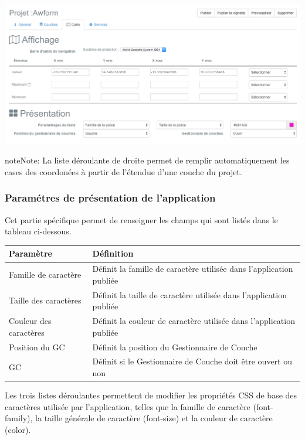 \documentclass[letterpaper,10pt,french]{sphinxmanual}
\begin{document}
\includegraphics[width=1.000\linewidth]{publisher-map-conf.png}

\begin{notice}{note}{Note:}
La liste déroulante de droite permet de remplir automatiquement les cases des coordonées à partir de l'étendue d'une couche du projet.
\end{notice}


\subsubsection{Paramétres de présentation de l'application}
\label{apps/appconfig:parametres-de-presentation-de-l-application}
Cet partie spécifique permet de renseigner les champs qui sont listés
dans le tableau ci-dessous.

\begin{tabulary}{\linewidth}{|L|L|}
\hline

\textbf{Paramètre}
 & 
\textbf{Définition}
\\
\hline
Famille de caractère
 & 
Définit la famille de caractère utilisée dans l'application publiée
\\
\hline
Taille des caractères
 & 
Définit la taille de caractère utilisée dans l'application publiée
\\
\hline
Couleur des caractères
 & 
Définit la couleur de caractère utilisée dans l'application publiée
\\
\hline
Position du GC
 & 
Définit la position du Gestionnaire de Couche
\\
\hline
GC
 & 
Définit si le Gestionnaire de Couche doit être ouvert ou non
\\
\hline\end{tabulary}


Les trois listes déroulantes permettent de modifier les propriétés CSS de base des caractères utilisée par l'application, telles que la famille de caractère (font-family), la taille générale de caractère (font-size) et la couleur de caractère (color).
\end{document}
